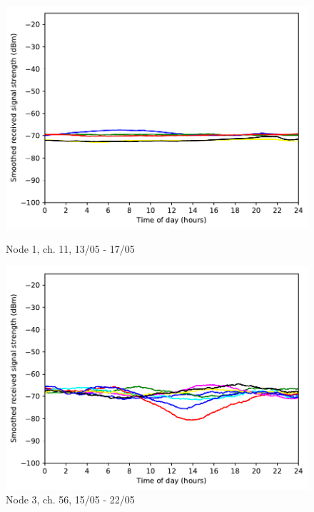\documentclass[a4paper, 11pt]{article}
\begin{document}
\begin{figure}
\begin{minipage}{0.47\textwidth}
	\includegraphics[width=\textwidth]{images/2_4_GHz/node1_2017-05-17_chan11_image}
    \caption{Node 1, ch. 11, 13/05 - 17/05} \label{node1-11}
\end{minipage}\hfill
\begin{minipage}{0.47\textwidth}
\centering
\includegraphics[width=\textwidth]{images/5_GHz/cot-node3-student_2017-05-22_chan36_image.pdf}
\caption{Node 3, ch. 56, 15/05 - 22/05}
\label{cot3_5ghz_pattern_chan36}
\end{minipage}\hfill
\end{figure}
\end{document}
